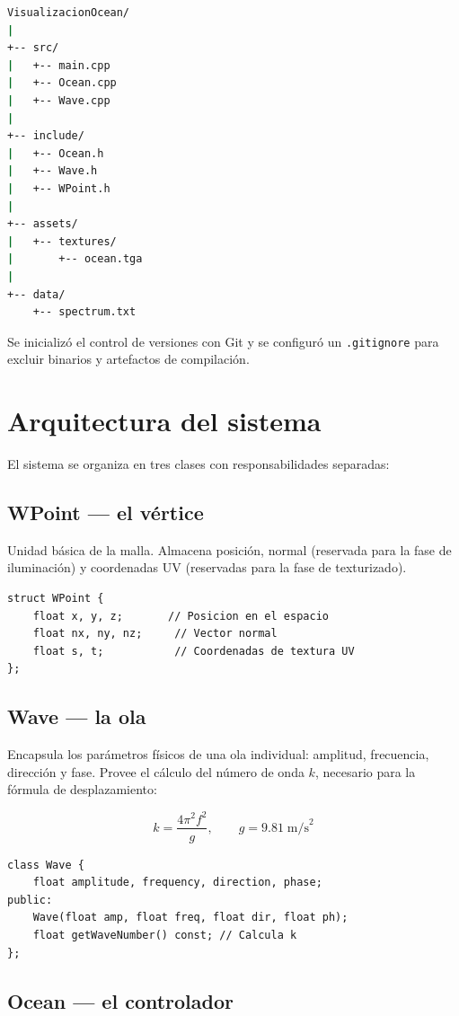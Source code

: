 \documentclass[11pt]{article}
\begin{document}
\begin{lstlisting}[language=bash]
VisualizacionOcean/
|
+-- src/
|   +-- main.cpp
|   +-- Ocean.cpp
|   +-- Wave.cpp
|
+-- include/
|   +-- Ocean.h
|   +-- Wave.h
|   +-- WPoint.h
|
+-- assets/
|   +-- textures/
|       +-- ocean.tga
|
+-- data/
    +-- spectrum.txt
\end{lstlisting}

Se inicializó el control de versiones con Git y se configuró un \texttt{.gitignore}
para excluir binarios y artefactos de compilación.

\section{Arquitectura del sistema}

El sistema se organiza en tres clases con responsabilidades separadas:

\subsection{WPoint --- el vértice}

Unidad básica de la malla. Almacena posición, normal (reservada para la fase de
iluminación) y coordenadas UV (reservadas para la fase de texturizado).

\begin{lstlisting}
struct WPoint {
    float x, y, z;       // Posicion en el espacio
    float nx, ny, nz;     // Vector normal
    float s, t;           // Coordenadas de textura UV
};
\end{lstlisting}

\subsection{Wave --- la ola}

Encapsula los parámetros físicos de una ola individual: amplitud, frecuencia,
dirección y fase. Provee el cálculo del número de onda $k$, necesario para la
fórmula de desplazamiento:

\[
k = \frac{4\pi^2 f^2}{g}, \qquad g = 9.81 \; \text{m/s}^2
\]

\begin{lstlisting}
class Wave {
    float amplitude, frequency, direction, phase;
public:
    Wave(float amp, float freq, float dir, float ph);
    float getWaveNumber() const; // Calcula k
};
\end{lstlisting}

\subsection{Ocean --- el controlador}
\end{document}
